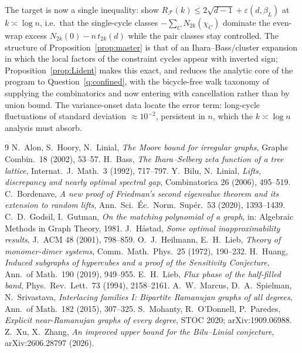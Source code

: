 \documentclass[11pt]{article}
\theoremstyle{remark}
\begin{document}
The target is now a single inequality: show
$R_{\mathcal F}(k)\le2\sqrt{d-1}+\varepsilon(d,\beta_L)$ at
$k\asymp\log n$, i.e.\ that the single-cycle classes
$-\sum_{C}N_{2k}(\chi_C)$ dominate the even-wrap excess
$N_{2k}(0)-n\,t_{2k}(d)$ while the pair classes stay controlled. The
structure of Proposition~\ref{prop:master} is that of an
Ihara--Bass/cluster expansion in which the local factors of the
constraint cycles appear with inverted sign; Proposition~\ref{prop:Lident}
makes this exact, and reduces the analytic core of the program to
Question~\ref{q:confined}, with the bicycle-free walk taxonomy of
\cite{mop20} supplying the combinatorics
and now entering with cancellation rather than by union bound. The
variance-onset data locate the error term: long-cycle fluctuations of
standard deviation $\approx10^{-2}$, persistent in $n$, which the
$k\asymp\log n$ analysis must absorb.

\begin{thebibliography}{9}
 N.~Alon, S.~Hoory, N.~Linial, \emph{The Moore bound
for irregular graphs}, Graphs Combin.~18 (2002), 53--57.
 H.~Bass, \emph{The Ihara--Selberg zeta function of a
tree lattice}, Internat.~J.~Math.~3 (1992), 717--797.
 Y.~Bilu, N.~Linial,
\emph{Lifts, discrepancy and nearly optimal spectral gap},
Combinatorica 26 (2006), 495--519.
 C.~Bordenave, \emph{A new proof of Friedman's
second eigenvalue theorem and its extension to random lifts},
Ann.~Sci.~\'Ec.~Norm.~Sup\'er.~53 (2020), 1393--1439.
 C.~D.~Godsil, I.~Gutman,
\emph{On the matching polynomial of a graph}, in: Algebraic Methods in
Graph Theory, 1981.
 J.~H\aa stad, \emph{Some optimal inapproximability
results}, J.~ACM 48 (2001), 798--859.
 O.~J.~Heilmann, E.~H.~Lieb,
\emph{Theory of monomer-dimer systems}, Comm.~Math.~Phys.~25 (1972),
190--232.
 H.~Huang, \emph{Induced subgraphs of hypercubes and a
proof of the Sensitivity Conjecture}, Ann.~of Math.~190 (2019), 949--955.
 E.~H.~Lieb, \emph{Flux phase of the half-filled band},
Phys.~Rev.~Lett.~73 (1994), 2158--2161.
 A.~W.~Marcus, D.~A.~Spielman, N.~Srivastava,
\emph{Interlacing families I: Bipartite Ramanujan graphs of all degrees},
Ann.~of Math.~182 (2015), 307--325.
 S.~Mohanty, R.~O'Donnell, P.~Paredes,
\emph{Explicit near-Ramanujan graphs of every degree}, STOC 2020;
arXiv:1909.06988.
 Z.~Xu, X.~Zhang, \emph{An improved upper bound for
the Bilu--Linial conjecture}, arXiv:2606.28797 (2026).
\end{thebibliography}
\end{document}
